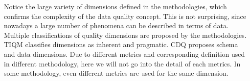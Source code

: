 \documentclass[pdftex,english,oribibl]{llncs}
\begin{document}
Notice the large variety of dimensions defined in the methodologies, which confirms the complexity of the data quality concept. This is not surprising, since nowadays a large number of phenomena can be described in terms of data. Multiple classifications of quality dimensions are proposed by the methodologies. TIQM classifies dimensions as inherent and pragmatic.
CDQ proposes schema and data dimensions.
Due to different metrics and corresponding definition used in different methodology, here we will not go into the detail of each metrics. In some methodology, even different metrics are used for the same dimension.

\begin{comment}
Table IX shows the metrics provided for quality dimensions by different methodologies.
We do not include metrics for semantic accuracy because the methodology addressing it, CDQ, do not provide specific measurement methods.
In general, multiple metrics are defined for each dimension, and each dimension accordingly has multiple entries in the table.
Note that subjective metrics such as user surveys have been defined for almost all quality dimensions.
Different metrics for the same dimension are identified by acronyms, which are used in Table X to associate them with the methodologies in which they are used and/or defined.
It is worth mentioning that the majority of metrics with only one occurrence in methodologies are in IQM, which analyzes the quality of Web information. The high number of measurement tools in the Web context results in a high number of metrics specific to IQM.

The last column of Table X provides for each dimension and each metric associated with the dimension, (1) the number of methodologies that use the metrics, and (2) the total number of methodologies that mention the corresponding dimension.
The ratio between these values measures the degree of consensus on dimension metrics among methodologies.
Such consensus is high for accuracy, completeness, and consistency, while it is significantly lower for two of the time-related dimensions, timeliness and currency, and almost all other dimensions.

The majority of metrics with only one occurrence in methodologies are mentioned in IQM, which analyzes the quality of Web information.
Such metrics are defined by considering the measurement tools that are available in the specific Web context.
For example, using a site analyzer, it is possible to assess dimensions such as accessibility, consistency, timeliness, conciseness, and maintainability.
Traffic analyzers can be used to assess applicability and convenience, while port scanners are useful to assess security.
The high number of measurement tools in the Web context results in a high number of metrics specific to IQM.
\end{comment}
\end{document}
